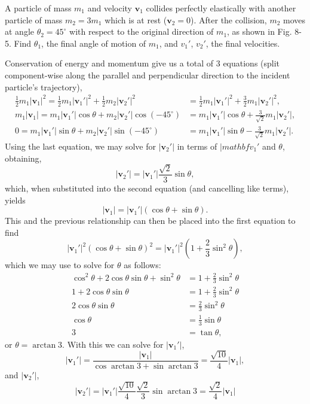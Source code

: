 \documentclass[../feynman-lectures-on-physics.tex]{subfiles}
\begin{document}
\begin{questions}
\question A particle of mass $m_1$ and velocity $\mathbf{v}_1$ collides
  perfectly elastically with another particle of mass $m_2=3m_1$ which is at
  rest ($\mathbf{v}_2=0$). After the collision, $m_2$ moves at angle
  $\theta_2=45^\circ$ with respect to the original direction of $m_1$, as
  shown in Fig. 8-5. Find $\theta_1$, the final angle of motion of $m_1$,
  and $v_1'$, $v_2'$, the final velocities.

  \begin{solution}
    Conservation of energy and momentum give us a total of $3$ equations (split
    component-wise along the parallel and perpendicular direction to the
    incident particle's trajectory),
    \begin{align*}
      \frac{1}{2}m_1|\mathbf{v}_1|^2 = \frac{1}{2}m_1|\mathbf{v}_1'|^2 + \frac{1}{2}m_2|\mathbf{v}_2'|^2 &= \frac{1}{2}m_1|\mathbf{v}_1'|^2 + \frac{3}{2}m_1|\mathbf{v}_2'|^2, \\
      m_1|\mathbf{v}_1| = m_1|\mathbf{v}_1'|\cos\theta + m_2|\mathbf{v}_2'|\cos({-45^\circ}) &= m_1|\mathbf{v}_1'|\cos\theta + \frac{3}{\sqrt{2}}m_1|\mathbf{v}_2'|, \\
      0 = m_1|\mathbf{v}_1'|\sin\theta + m_2|\mathbf{v}_2'|\sin({-45^\circ}) &= m_1|\mathbf{v}_1'|\sin\theta - \frac{3}{\sqrt{2}}m_1|\mathbf{v}_2'|.
    \end{align*}
    Using the last equation, we may solve for $|\mathbf{v}_2'|$ in terms of $|mathbf{v}_1'$ and $\theta$,
    obtaining,
    \[
      |\mathbf{v}_2'| = |\mathbf{v}_1'|\frac{\sqrt{2}}{3}\sin\theta,
    \]
    which, when substituted into the second equation (and cancelling like terms),
    yields
    \[
      |\mathbf{v}_1| = |\mathbf{v}_1'|(\cos\theta + \sin\theta).
    \]
    This and the previous relationship can then be placed into the first equation to find
    \[
      |\mathbf{v}_1'|^2(\cos\theta+\sin\theta)^2 = |\mathbf{v}_1'|^2(1 + \frac{2}{3}\sin^2\theta),
    \]
    which we may use to solve for $\theta$ as follows:
    \begin{align*}
      \cos^2\theta + 2\cos\theta\sin\theta + \sin^2\theta &= 1 + \frac{2}{3}\sin^2\theta \\
      1 + 2\cos\theta\sin\theta &= 1 + \frac{2}{3}\sin^2\theta \\
      2\cos\theta\sin\theta &= \frac{2}{3}\sin^2\theta \\
      \cos\theta &= \frac{1}{3}\sin\theta \\
      3 &= \tan\theta,
    \end{align*}
    or $\theta = \arctan3$. With this we can solve for $|\mathbf{v}_1'|$,
    \[
      |\mathbf{v}_1'| = \frac{|\mathbf{v}_1|}{\cos\arctan3+ \sin\arctan3} = \frac{\sqrt{10}}{4}|\mathbf{v}_1|,
    \]
    and $|\mathbf{v}_2'|$,
    \[
      |\mathbf{v}_2'| =
      |\mathbf{v}_1'|\frac{\sqrt{10}}{4}\frac{\sqrt{2}}{3}\sin\arctan{3} = \frac{\sqrt{2}}{4}|\mathbf{v}_1|
    \]
  \end{solution}


\end{questions}
\end{document}
